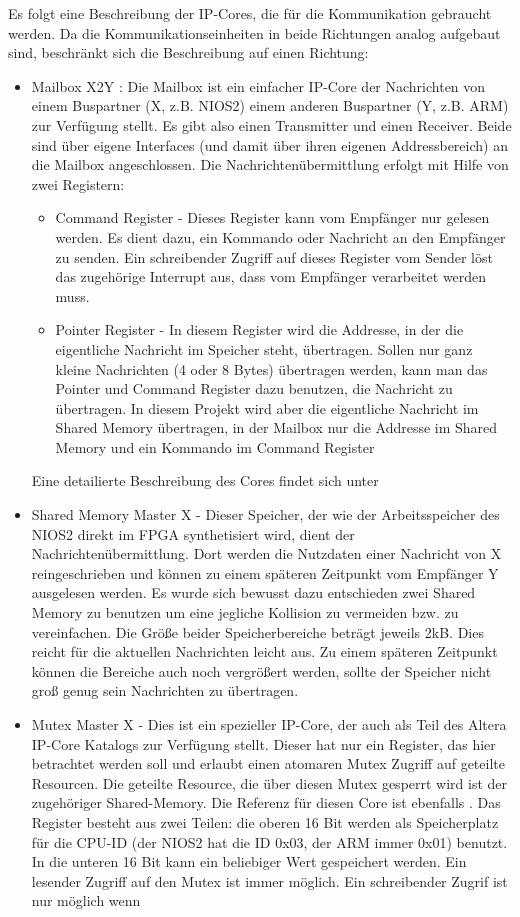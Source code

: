 Es folgt eine Beschreibung der \ac{IP}-Cores, die für die Kommunikation gebraucht werden. Da die Kommunikationseinheiten in beide Richtungen analog aufgebaut sind, beschränkt sich die Beschreibung auf einen Richtung:
\begin{itemize}
	\item Mailbox X2Y : Die Mailbox ist ein einfacher IP-Core der Nachrichten von einem Buspartner (X, z.B. NIOS2) einem anderen Buspartner (Y, z.B. ARM) zur Verfügung stellt. Es gibt also einen Transmitter und einen Receiver. Beide sind über eigene Interfaces (und damit über ihren eigenen Addressbereich) an die Mailbox angeschlossen. Die Nachrichtenübermittlung erfolgt mit Hilfe von zwei Registern:
	\begin{itemize}
		\item Command Register - Dieses Register kann vom Empfänger nur gelesen werden. Es dient dazu, ein Kommando oder Nachricht an den Empfänger zu senden. Ein schreibender Zugriff auf dieses Register vom Sender löst das zugehörige Interrupt aus, dass vom Empfänger verarbeitet werden muss.
		\item Pointer Register - In diesem Register wird die Addresse, in der die eigentliche Nachricht im Speicher steht, übertragen. Sollen nur ganz kleine Nachrichten (4 oder 8 Bytes) übertragen werden, kann man das Pointer und Command Register dazu benutzen, die Nachricht zu übertragen. In diesem Projekt wird aber die eigentliche Nachricht im Shared Memory übertragen, in der Mailbox nur die Addresse im Shared Memory und ein Kommando im Command Register
	\end{itemize}
	Eine detailierte Beschreibung des Cores findet sich unter \cite[470ff]{embedded_guide}
	\item Shared Memory Master X - Dieser Speicher, der wie der Arbeitsspeicher des NIOS2 direkt im \ac{FPGA} synthetisiert wird, dient der Nachrichtenübermittlung. Dort werden die Nutzdaten einer Nachricht von X reingeschrieben und können zu einem späteren Zeitpunkt vom Empfänger Y ausgelesen werden. Es wurde sich bewusst dazu entschieden zwei Shared Memory zu benutzen um eine jegliche Kollision zu vermeiden bzw. zu vereinfachen. Die Größe beider Speicherbereiche beträgt jeweils 2kB. Dies reicht für die aktuellen Nachrichten leicht aus. Zu einem späteren Zeitpunkt können die Bereiche auch noch vergrößert werden, sollte der Speicher nicht groß genug sein Nachrichten zu übertragen.
	\item Mutex Master X - Dies ist ein spezieller \ac{IP}-Core, der auch als Teil des Altera \ac{IP}-Core Katalogs zur Verfügung stellt. Dieser hat nur ein Register, das hier betrachtet werden soll und erlaubt einen atomaren Mutex Zugriff auf geteilte Resourcen. Die geteilte Resource, die über diesen Mutex gesperrt wird ist der zugehöriger Shared-Memory. Die Referenz für diesen Core ist ebenfalls \cite[319ff]{embedded_guide}. Das Register besteht aus zwei Teilen: die oberen 16 Bit werden als Speicherplatz für die CPU-ID (der NIOS2 hat die ID 0x03, der ARM immer 0x01) benutzt. In die unteren 16 Bit kann ein beliebiger Wert gespeichert werden. Ein lesender Zugriff auf den Mutex ist immer möglich. Ein schreibender Zugrif ist nur möglich wenn

\end{itemize}
